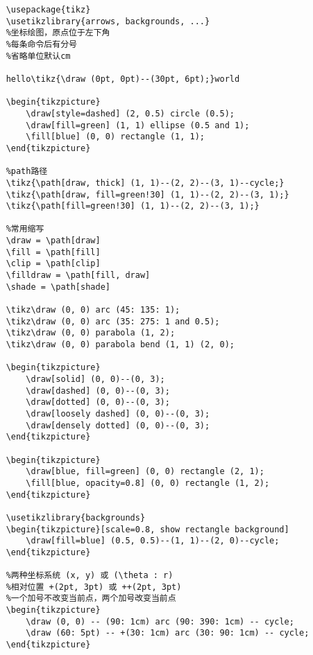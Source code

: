 \documentclass[12pt]{ctexart}
\begin{document}
\begin{verbatim}
    \usepackage{tikz}
    \usetikzlibrary{arrows, backgrounds, ...}
    %坐标绘图，原点位于左下角
    %每条命令后有分号
    %省略单位默认cm

    hello\tikz{\draw (0pt, 0pt)--(30pt, 6pt);}world

    \begin{tikzpicture}
        \draw[style=dashed] (2, 0.5) circle (0.5);
        \draw[fill=green] (1, 1) ellipse (0.5 and 1);
        \fill[blue] (0, 0) rectangle (1, 1);
    \end{tikzpicture}

    %path路径
    \tikz{\path[draw, thick] (1, 1)--(2, 2)--(3, 1)--cycle;}
    \tikz{\path[draw, fill=green!30] (1, 1)--(2, 2)--(3, 1);}
    \tikz{\path[fill=green!30] (1, 1)--(2, 2)--(3, 1);}

    %常用缩写
    \draw = \path[draw]
    \fill = \path[fill]
    \clip = \path[clip]
    \filldraw = \path[fill, draw]
    \shade = \path[shade]

    \tikz\draw (0, 0) arc (45: 135: 1);
    \tikz\draw (0, 0) arc (35: 275: 1 and 0.5);
    \tikz\draw (0, 0) parabola (1, 2);
    \tikz\draw (0, 0) parabola bend (1, 1) (2, 0);

    \begin{tikzpicture}
        \draw[solid] (0, 0)--(0, 3);
        \draw[dashed] (0, 0)--(0, 3);
        \draw[dotted] (0, 0)--(0, 3);
        \draw[loosely dashed] (0, 0)--(0, 3);
        \draw[densely dotted] (0, 0)--(0, 3);
    \end{tikzpicture}

    \begin{tikzpicture}
        \draw[blue, fill=green] (0, 0) rectangle (2, 1);
        \fill[blue, opacity=0.8] (0, 0) rectangle (1, 2);
    \end{tikzpicture}

    \usetikzlibrary{backgrounds}
    \begin{tikzpicture}[scale=0.8, show rectangle background]
        \draw[fill=blue] (0.5, 0.5)--(1, 1)--(2, 0)--cycle;
    \end{tikzpicture}

    %两种坐标系统 (x, y) 或 (\theta : r)
    %相对位置 +(2pt, 3pt) 或 ++(2pt, 3pt)
    %一个加号不改变当前点，两个加号改变当前点
    \begin{tikzpicture}
        \draw (0, 0) -- (90: 1cm) arc (90: 390: 1cm) -- cycle;
        \draw (60: 5pt) -- +(30: 1cm) arc (30: 90: 1cm) -- cycle;
    \end{tikzpicture}


\end{verbatim}
\end{document}
